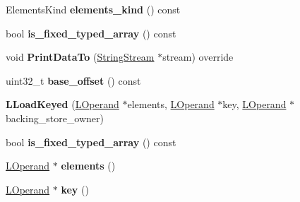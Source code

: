 \begin{DoxyCompactItemize}
\item 
Elements\+Kind {\bfseries elements\+\_\+kind} () const \hypertarget{classv8_1_1internal_1_1_l_load_keyed_a59cb1eff8d46bdb1d5d5c59aec4e9f47}{}\label{classv8_1_1internal_1_1_l_load_keyed_a59cb1eff8d46bdb1d5d5c59aec4e9f47}

\item 
bool {\bfseries is\+\_\+fixed\+\_\+typed\+\_\+array} () const \hypertarget{classv8_1_1internal_1_1_l_load_keyed_a4bfabc8b862c384fa4cf2d12bbeb40b1}{}\label{classv8_1_1internal_1_1_l_load_keyed_a4bfabc8b862c384fa4cf2d12bbeb40b1}

\item 
void {\bfseries Print\+Data\+To} (\hyperlink{classv8_1_1internal_1_1_string_stream}{String\+Stream} $\ast$stream) override\hypertarget{classv8_1_1internal_1_1_l_load_keyed_ab79d974cf88e1e1dbd886b24f0ff1984}{}\label{classv8_1_1internal_1_1_l_load_keyed_ab79d974cf88e1e1dbd886b24f0ff1984}

\item 
uint32\+\_\+t {\bfseries base\+\_\+offset} () const \hypertarget{classv8_1_1internal_1_1_l_load_keyed_a944c93975338d43236e1a696b686f4a4}{}\label{classv8_1_1internal_1_1_l_load_keyed_a944c93975338d43236e1a696b686f4a4}

\item 
{\bfseries L\+Load\+Keyed} (\hyperlink{classv8_1_1internal_1_1_l_operand}{L\+Operand} $\ast$elements, \hyperlink{classv8_1_1internal_1_1_l_operand}{L\+Operand} $\ast$key, \hyperlink{classv8_1_1internal_1_1_l_operand}{L\+Operand} $\ast$backing\+\_\+store\+\_\+owner)\hypertarget{classv8_1_1internal_1_1_l_load_keyed_ad304d9ea6496224e4a11a6cae2ee335b}{}\label{classv8_1_1internal_1_1_l_load_keyed_ad304d9ea6496224e4a11a6cae2ee335b}

\item 
bool {\bfseries is\+\_\+fixed\+\_\+typed\+\_\+array} () const \hypertarget{classv8_1_1internal_1_1_l_load_keyed_a4bfabc8b862c384fa4cf2d12bbeb40b1}{}\label{classv8_1_1internal_1_1_l_load_keyed_a4bfabc8b862c384fa4cf2d12bbeb40b1}

\item 
\hyperlink{classv8_1_1internal_1_1_l_operand}{L\+Operand} $\ast$ {\bfseries elements} ()\hypertarget{classv8_1_1internal_1_1_l_load_keyed_a2fdaa6ebcc228ac46d2a03cffd1468ea}{}\label{classv8_1_1internal_1_1_l_load_keyed_a2fdaa6ebcc228ac46d2a03cffd1468ea}

\item 
\hyperlink{classv8_1_1internal_1_1_l_operand}{L\+Operand} $\ast$ {\bfseries key} ()\hypertarget{classv8_1_1internal_1_1_l_load_keyed_aea9caf0333cbad4a04007bd93e0fb176}{}\label{classv8_1_1internal_1_1_l_load_keyed_aea9caf0333cbad4a04007bd93e0fb176}


\end{DoxyCompactItemize}
